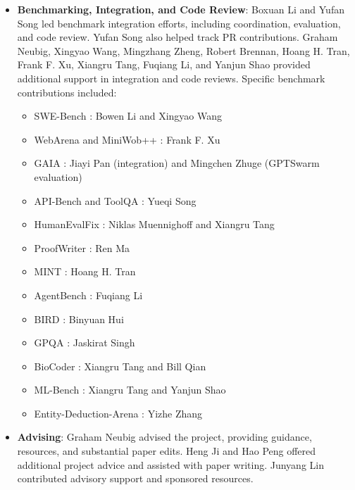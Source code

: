 \begin{itemize}[noitemsep,topsep=0pt,parsep=2pt,partopsep=0pt,leftmargin=18pt]
\item \textbf{Benchmarking, Integration, and Code Review}: Boxuan Li and Yufan Song led benchmark integration efforts, including coordination, evaluation, and code review. Yufan Song also helped track PR contributions. Graham Neubig, Xingyao Wang, Mingzhang Zheng, Robert Brennan, Hoang H. Tran, Frank F. Xu, Xiangru Tang, Fuqiang Li, and Yanjun Shao provided additional support in integration and code reviews.
Specific benchmark contributions included:
\begin{itemize}
    \item SWE-Bench \cite{jimenez2024swebench}: Bowen Li and Xingyao Wang
    \item WebArena \cite{zhou2023webarena} and MiniWob++ \cite{liu2018reinforcement}: Frank F. Xu
    \item GAIA \cite{gaia}: Jiayi Pan (integration) and Mingchen Zhuge (GPTSwarm evaluation)
    \item API-Bench \cite{patil2023gorilla} and ToolQA \cite{zhuang2024toolqa}: Yueqi Song
    \item HumanEvalFix \cite{muennighoff2024octopack}: Niklas Muennighoff and Xiangru Tang
    \item ProofWriter \cite{proofwriter}: Ren Ma
    \item MINT \cite{wang2024mint}: Hoang H. Tran
    \item AgentBench \cite{liu2023agentbench}: Fuqiang Li
    \item BIRD \cite{bird}: Binyuan Hui
    \item GPQA \cite{rein2023gpqa}: Jaskirat Singh
    \item BioCoder \cite{tang2023biocoder}: Xiangru Tang and Bill Qian
    \item ML-Bench \cite{liu2024mlbench}: Xiangru Tang and Yanjun Shao
    \item Entity-Deduction-Arena \cite{zhang2023entity}: Yizhe Zhang
\end{itemize}

\item \textbf{Advising}: Graham Neubig advised the project, providing guidance, resources, and substantial paper edits. Heng Ji and Hao Peng offered additional project advice and assisted with paper writing. Junyang Lin contributed advisory support and sponsored resources.
\end{itemize}














